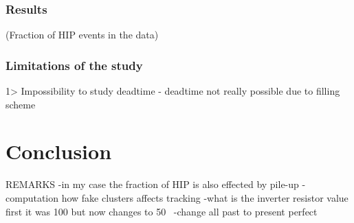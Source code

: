 \subsubsection{Results}
      (Fraction of HIP events in the data)

\subsubsection{Limitations of the study}
         1> Impossibility to study deadtime
- deadtime not really possible due to filling scheme

\section{Conclusion}




REMARKS
-in my case the fraction of HIP is also effected by pile-up
-computation how fake clusters affects tracking
-what is the inverter resistor value first it was 100 but now changes to 50~\cite{Gennai:2003as}
-change all past to present perfect
